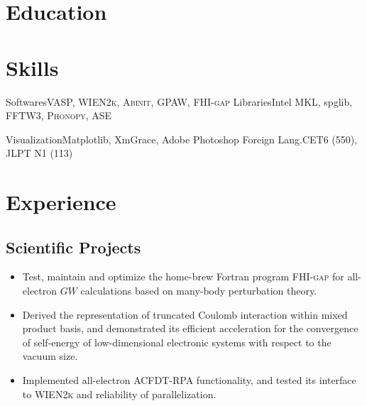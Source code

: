 
\section{\hei Education}



\section{Skills}

           {Softwares}{VASP, \textsc{WIEN2k}, \textsc{Abinit}, \textsc{GPAW}, \textsc{FHI-gap}}
           {Libraries}{Intel{\textregistered} MKL, spglib, FFTW3, \textsc{Phonopy}, \textsc{ASE}}
           
           {Visualization}{Matplotlib, XmGrace, Adobe{\textregistered} Photoshop}
           {Foreign Lang.}{CET6 (550), JLPT N1 (113)}{}{}

\section{Experience}

\subsection{Scientific Projects}

{
    \begin{itemize}%
        \item
        Test, maintain and optimize the home-brew Fortran program \textsc{FHI-gap} for all-electron $GW$ calculations based on many-body perturbation theory.
        \item Derived the representation of truncated Coulomb interaction within mixed product basis, and demonstrated its efficient acceleration for the convergence of self-energy of low-dimensional electronic systems with respect to the vacuum size.
        \item Implemented all-electron ACFDT-RPA functionality, and tested its interface to \textsc{WIEN2k} and reliability of parallelization.
    \end{itemize}
}

